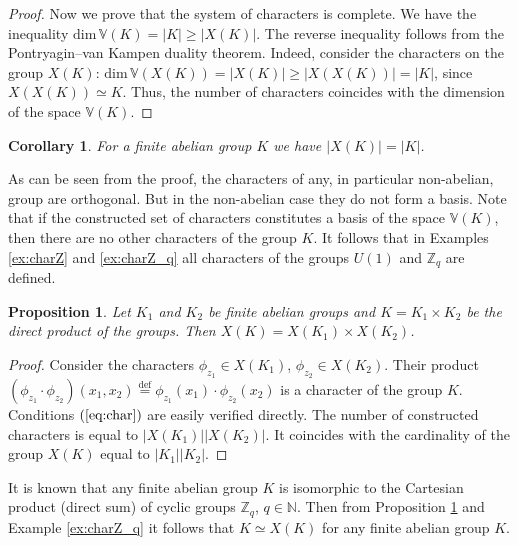 \documentclass[11pt]{article}
\newtheorem{claim}{Proposition}[section]
\newtheorem{corollary}{Corollary}[section]
\theoremstyle{definition}
\begin{document}
{{{\begin{proof}
     Now we prove that the system of characters is complete. We have
     the inequality
    $\mathrm{dim}\,\mathbb{V}({K}) = |{K}|\ge |X(K)|$.
    The reverse inequality follows from the Pontryagin--van Kampen duality theorem. Indeed,
    consider the characters on the group $X(K)$:
    $\mathrm{dim}\,\mathbb{V}(X({K})) = |X({K})|\ge |X(X(K))|=|K|$, since $X(X(K))\simeq K$.
    Thus, the number of characters coincides with the dimension of the space $\mathbb{V}({K})$.
\end{proof}

\begin{corollary} For a finite abelian group $K$ we have $|X(K)|=|K|$.
\end{corollary}


As can be seen from the proof, the characters of any, in particular non-abelian, group are orthogonal. But in the non-abelian case they do not form a basis.
Note that if the constructed set of characters constitutes a basis
of the space $\mathbb{V}({K})$, then there are no other characters of the group $K$.
It follows that in Examples \ref{ex:charZ} and
\ref{ex:charZ_q} all characters of the groups $U(1)$ and
$\mathbb{Z}_q$ are defined.





\begin{claim}\label{c:charact_cartesian_product}
    Let  $K_1$ and $K_2$ be finite abelian groups and $K=K_1\times K_2$ be the direct product of the groups.
    Then $X(K)=X({K}_1)\times X({K}_2)$.
\end{claim}

\begin{proof}
        Consider the characters $\phi_{z_1}\in X({K}_1)$, $\phi_{z_2}\in X({K}_2)$. Their
     product
    $(\phi_{z_1}\cdot\phi_{z_2})(x_1,x_2)\stackrel{\text{def}}{=}\phi_{z_1}(x_1)\cdot\phi_{z_2}(x_2)$
     is a character of the group $K$.
   Conditions $(\ref{eq:char})$ are easily verified directly.
   The number of constructed characters is equal to $|X(K_1)||X(K_2)|$. It coincides
   with the cardinality of the group $X(K)$ equal to
   $|K_1||K_2|$.
\end{proof}

It is known that any finite abelian group $K$ is isomorphic to the Cartesian
product (direct sum) of cyclic groups $\mathbb{Z}_q$, $q\in
\mathbb{N}$. Then from Proposition \ref{c:charact_cartesian_product}
and Example \ref{ex:charZ_q} it follows that $K\simeq X(K)$ for any
finite abelian group $K$.



}}}
\end{document}
